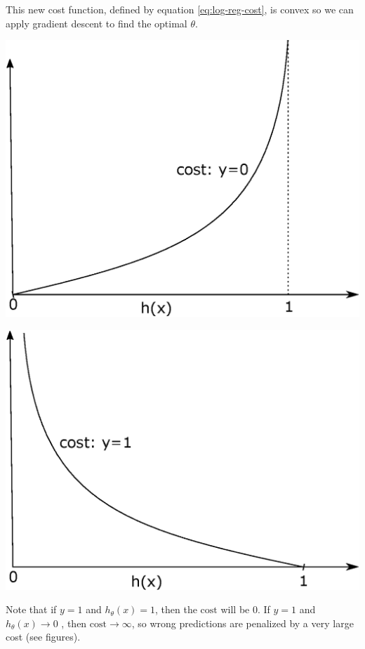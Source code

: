 \documentclass[a4paper,11pt]{report}
\newcommand{\cost}{\mathrm{cost}}
\begin{document}
This new cost function, defined by equation \eqref{eq:log-reg-cost}, is convex so we can apply gradient descent to find the optimal $\theta$.

\hspace{1.0in}

\begin{center}
\begin{minipage}{0.48\textwidth}
 \centering
 \includegraphics[width=.8\linewidth]{Images/cost_0}
\end{minipage}\hfill
\begin{minipage}{0.48\textwidth}
 \centering
 \includegraphics[width=.8\linewidth]{Images/cost_1}
\end{minipage}
\end{center}

Note that if $y = 1$ and $h_\theta(x) = 1$, then the $\cost$ will be $0$. If $y = 1$ and $h_\theta(x) \longrightarrow 0$ , then $\cost\longrightarrow \infty$, so wrong predictions are penalized by a very large cost (see figures).
\end{document}
